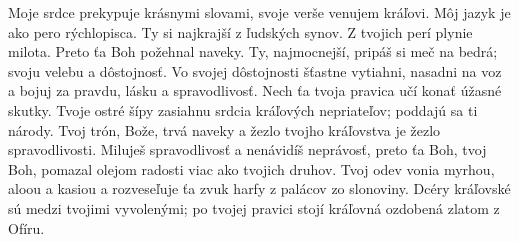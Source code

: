 Moje srdce prekypuje krásnymi slovami,
svoje verše venujem kráľovi.
\versseparator
Môj jazyk je ako pero rýchlopisca.
\versseparator
Ty si najkrajší z ľudských synov.
Z tvojich perí plynie milota.
Preto ťa Boh požehnal naveky.
\versseparator
Ty, najmocnejší, pripáš si meč na bedrá;
\versseparator
svoju velebu a dôstojnosť.
Vo svojej dôstojnosti šťastne vytiahni, nasadni na voz
\versseparator
a bojuj za pravdu, lásku a spravodlivosť.
Nech ťa tvoja pravica učí konať úžasné skutky.
\versseparator
Tvoje ostré šípy
zasiahnu srdcia kráľových nepriateľov;
poddajú sa ti národy.
\versseparator
Tvoj trón, Bože, trvá naveky
a žezlo tvojho kráľovstva je žezlo spravodlivosti.
\versseparator
Miluješ spravodlivosť a nenávidíš neprávosť,
preto ťa Boh, tvoj Boh, pomazal
olejom radosti viac ako tvojich druhov.
\versseparator
Tvoj odev vonia myrhou, aloou a kasiou
a rozveseľuje ťa zvuk harfy z palácov zo slonoviny.
Dcéry kráľovské sú medzi tvojimi vyvolenými;
\versseparator
po tvojej pravici stojí kráľovná ozdobená zlatom z Ofíru. 